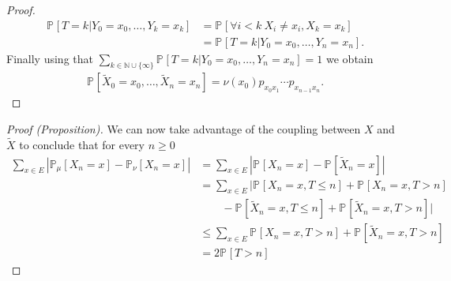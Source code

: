{\begin{proof}
 \begin{align}
	 \mathbb{P}_{} \left[ T=k | Y_0=x_0, \ldots , Y_k =x_k \right] &= \mathbb{P}_{} \left[ \forall i<k\ X_i \neq x_i, X_k=x_k \right] \\
								       &= \mathbb{P}_{} \left[ T=k | Y_0=x_0, \ldots , Y_n=x_n \right] . 
\end{align}
Finally using that $\sum_{k \in \mathbb{N}\cup \{\infty\}}^{} \mathbb{P}_{} \left[ T=k | Y_0 = x_0, \ldots , Y_n =x_n \right] =1$ we obtain
\begin{align}
	\mathbb{P}_{} \left[ \tilde{X}_0 = x_0, \ldots , \tilde{X}_n=x_n \right] = \nu (x_0) p_{x_0 x_1} \cdots p_{x_{n-1}x_n}.
\end{align}
\end{proof}
\begin{proof}[Proof (Proposition)]
We can now take advantage of the coupling between $X$ and $\tilde{X}$ to conclude that for every $n\geq 0$ 
\begin{align}
	\sum_{x \in E}^{} \left| \mathbb{P}_{\mu} \left[ X_n = x \right] - \mathbb{P}_{\nu } \left[ X_n=x \right] \right|
	&= \sum_{x \in E}^{} \left| \mathbb{P}_{} \left[X_n =x  \right] - \mathbb{P}_{} \left[ \tilde{X}_n = x \right] \right| \\
	&= \sum_{x \in E}^{} \Big| \mathbb{P}_{} \left[ X_n =x, T \leq n \right] + \mathbb{P}_{} \left[ X_n = x, T>n \right] \\
	&\qquad  - \mathbb{P}_{} \left[ \tilde{X}_n = x, T \leq n \right] + \mathbb{P}_{} \left[ \tilde{X}_n = x, T>n \right] \Big| \\
	&\leq \sum_{x \in E}^{} \mathbb{P}_{} \left[ X_n=x, T>n \right] + \mathbb{P}_{} \left[ \tilde{X}_n=x, T>n \right]\\
	&= 2\mathbb{P}_{} \left[ T>n \right] 
\end{align}
\end{proof}
}


